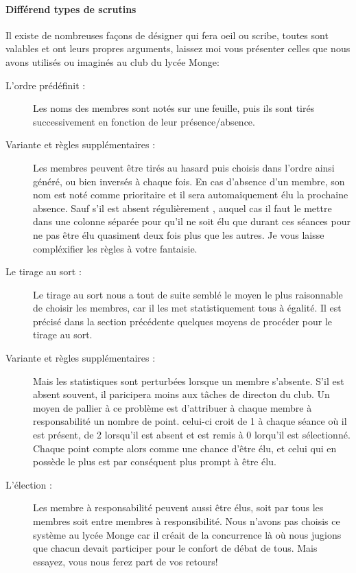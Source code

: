 \documentclass[a4paper,12pt]{article}
\begin{document}
\paragraph{Différend types de scrutins}
Il existe de nombreuses façons de désigner qui fera oeil ou scribe, toutes sont valables et ont leurs propres arguments, laissez moi vous présenter celles que nous avons utilisés ou imaginés au club du lycée Monge:
\begin{description}
 \item[L'ordre prédéfinit :] Les noms des membres sont notés sur une feuille, puis ils sont tirés successivement en fonction de leur présence/absence.
 \item[Variante et règles supplémentaires :] Les membres peuvent être tirés au hasard puis choisis dans l'ordre ainsi généré, ou bien inversés à chaque fois. En cas d'absence d'un membre, son nom est noté comme prioritaire et il sera automaiquement élu la prochaine absence. Sauf s'il est absent régulièrement                                     , auquel cas il faut le mettre dans une colonne séparée pour qu'il ne soit élu que durant ces séances pour ne pas être élu quasiment deux fois plus que les autres. Je vous laisse compléxifier les règles à votre fantaisie.
 \item[Le tirage au sort :] Le tirage au sort nous a tout de suite semblé le moyen le plus raisonnable de choisir les membres, car il les met statistiquement tous à égalité. Il est précisé dans la section précédente quelques moyens de procéder pour le tirage au sort.
 \item[Variante et règles supplémentaires :] Mais les statistiques sont perturbées lorsque un membre s'absente. S'il est absent souvent, il paricipera moins aux tâches de directon du club. Un moyen de pallier à ce problème est d'attribuer à chaque membre à responsabilité un nombre de point. celui-ci croit de 1 à chaque séance où il est présent, de 2 lorsqu'il est absent et est remis à 0 lorqu'il est sélectionné. Chaque point compte alors comme une chance d'être élu, et celui qui en possède le plus est par conséquent plus prompt à être élu.
 \item[L'élection :] Les membre à responsabilité peuvent aussi être élus, soit par tous les membres soit entre membres à responsibilité. Nous n'avons pas choisis ce système au lycée Monge car il créait de la concurrence là où nous jugions que chacun devait participer pour le confort de débat de tous. Mais essayez, vous nous ferez part de vos retours!
\end{description}
\end{document}

